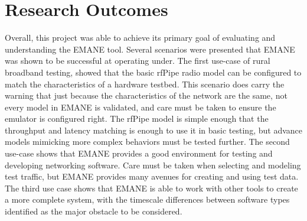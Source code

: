 \section{Research Outcomes}
Overall, this project was able to achieve its primary goal of evaluating and understanding the EMANE tool.
Several scenarios were presented that EMANE was shown to be successful at operating under.
The first use-case of rural broadband testing, showed that the basic rfPipe radio model can be configured to match the characteristics of a hardware testbed.
This scenario does carry the warning that just because the characteristics of the network are the same, not every model in EMANE is validated, and care must be taken to ensure the emulator is configured right.
The rfPipe model is simple enough that the throughput and latency matching is enough to use it in basic testing, but advance models mimicking more complex behaviors must be tested further.
The second use-case shows that EMANE provides a good environment for testing and developing networking software.
Care must be taken when selecting and modeling test traffic, but EMANE provides many avenues for creating and using test data.
The third use case shows that EMANE is able to work with other tools to create a more complete system, with the timescale differences between software types identified as the major obstacle to be considered.

